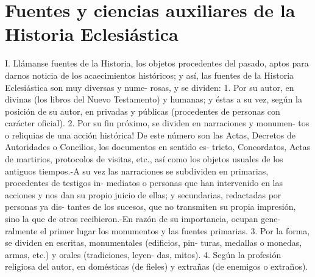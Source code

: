 \raggedbottom{} \documentclass[12pt, a4paper]{book}
\begin{document}
\section{Fuentes y ciencias auxiliares de la Historia Eclesiástica}
I. Llámanse fuentes de la Historia, los objetos procedentes del
pasado, aptos para darnos noticia de los acaecimientos históricos; y
así, las fuentes de la Historia Eclesiástica son muy diversas y nume-
rosas, y se dividen: 1. Por su autor, en divinas (los libros del Nuevo
Testamento) y humanas; y éstas a su vez, según la posición de su
autor, en privadas y públicas (procedentes de personas con carácter
oficial). 2. Por su fin próximo, se dividen en narraciones y monumen-
tos o reliquias de una acción histórica! De este número son las Actas,
Decretos de Autoridades o Concilios, los documentos en sentido es-
tricto, Concordatos, Actas de martirios, protocolos de visitas, etc.,
así como los objetos usuales de los antiguos tiempos.-A su vez las
narraciones se subdividen en primarias, procedentes de testigos in-
mediatos o personas que han intervenido en las acciones y nos dan su
propio juicio de ellas; y secundarias, redactadas por personas ya dis-
tantes de los sucesos, que no transmiten su propia impresión, sino la
que de otros recibieron.-En razón de su importancia, ocupan gene-
ralmente el primer lugar los monumentos y las fuentes primarias.
3. Por la forma, se dividen en escritas, monumentales (edificios, pin-
turas, medallas o monedas, armas, etc.) y orales (tradiciones, leyen-
das, mitos). 4. Según la profesión religiosa del autor, en domésticas
(de fieles) y extrañas (de enemigos o extraños).
\end{document}

